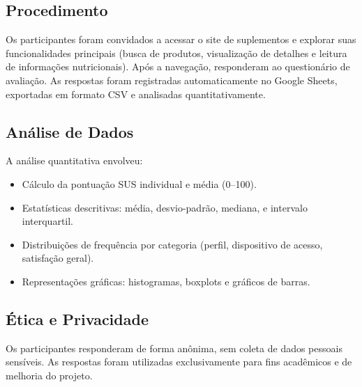 \documentclass[12pt,a4paper]{article}
\begin{document}
\subsection{Procedimento}
Os participantes foram convidados a acessar o site de suplementos e explorar suas funcionalidades principais (busca de produtos, visualização de detalhes e leitura de informações nutricionais). Após a navegação, responderam ao questionário de avaliação. As respostas foram registradas automaticamente no Google Sheets, exportadas em formato CSV e analisadas quantitativamente.

\subsection{Análise de Dados}
A análise quantitativa envolveu:
\begin{itemize}
  \item Cálculo da pontuação SUS individual e média (0–100).
  \item Estatísticas descritivas: média, desvio-padrão, mediana, e intervalo interquartil.
  \item Distribuições de frequência por categoria (perfil, dispositivo de acesso, satisfação geral).
  \item Representações gráficas: histogramas, boxplots e gráficos de barras.
\end{itemize}

\subsection{Ética e Privacidade}
Os participantes responderam de forma anônima, sem coleta de dados pessoais sensíveis. As respostas foram utilizadas exclusivamente para fins acadêmicos e de melhoria do projeto.
\end{document}
